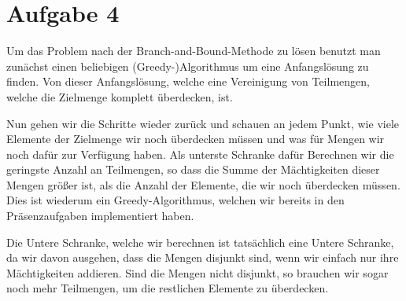 \documentclass{article}
\begin{document}
\section*{Aufgabe 4}

Um das Problem nach der Branch-and-Bound-Methode zu lösen benutzt man zunächst
einen beliebigen (Greedy-)Algorithmus um eine Anfangslösung zu finden. Von
dieser Anfangslösung, welche eine Vereinigung von Teilmengen, welche die
Zielmenge komplett überdecken, ist.

Nun gehen wir die Schritte wieder zurück und schauen an jedem Punkt, wie viele
Elemente der Zielmenge wir noch überdecken müssen und was für Mengen wir noch
dafür zur Verfügung haben. Als unterste Schranke dafür Berechnen wir die
geringste Anzahl an Teilmengen, so dass die Summe der Mächtigkeiten dieser
Mengen größer ist, als die Anzahl der Elemente, die wir noch überdecken müssen.
Dies ist wiederum ein Greedy-Algorithmus, welchen wir bereits in den
Präsenzaufgaben implementiert haben.

Die Untere Schranke, welche wir berechnen ist tatsächlich eine Untere Schranke,
da wir davon ausgehen, dass die Mengen disjunkt sind, wenn wir einfach nur ihre
Mächtigkeiten addieren. Sind die Mengen nicht disjunkt, so brauchen wir sogar
noch mehr Teilmengen, um die restlichen Elemente zu überdecken.
\end{document}
